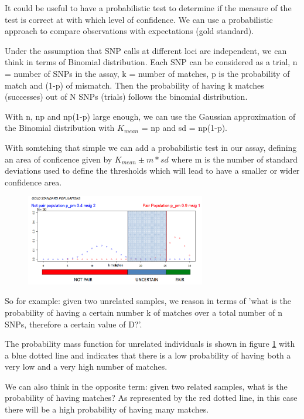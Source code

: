 It could be useful to have a probabilistic test to determine if the measure of the test is correct at with which level of confidence. We can use a probabilistic approach to compare observations with expectations (gold standard).

\bigskip
Under the assumption that SNP calls at different loci are independent, we can think in terms of Binomial distribution. Each SNP can be considered as a trial, n = number of SNPs in the assay, k = number of matches, p is the probability of match and (1-p) of mismatch. Then the probability of having k matches (successes) out of N SNPs (trials) follows the binomial distribution.

With n, np and np(1-p) large enough, we can use the Gaussian approximation of the Binomial distribution with $K_{mean}$ = np and sd = np(1-p). 

With somtehing that simple we can add a probabilistic test in our assay, defining an area of conficence given by $K_{mean} \pm m * sd$ where m is the number of standard deviations used to define the thresholds which will lead to have a smaller or wider confidence area. 

\begin{figure}
	\centering
	\includegraphics[width=0.7\textwidth]{double_test.PNG}
	\caption{\label{fig:prob_test}}
\end{figure}

\bigskip
So for example: given two unrelated samples, we reason in terms of 'what is the probability of having a certain number k of matches over a total number of n SNPs, therefore a certain value of D?'. 

The probability mass function for unrelated individuals is shown in figure \ref{fig:prob_test} with a blue dotted line and indicates that there is a low probability of having both a very low and a very high number of matches. 

We can also think in the opposite term: given two related samples, what is the probability of having  matches? As represented by the red dotted line, in this case there will be a high probability of having many matches. 

